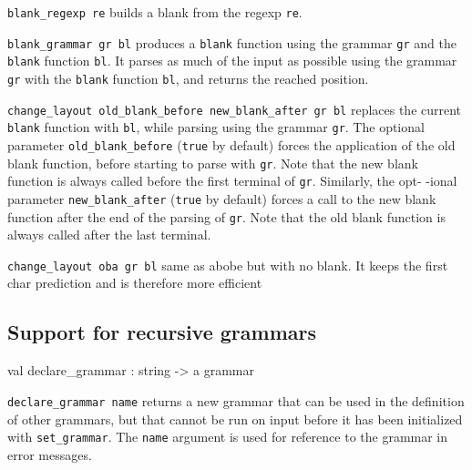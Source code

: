 \documentclass[11pt]{article}
\begin{document}
{\tt{blank\_regexp re}} builds a blank from the regexp {\tt{re}}.



{\tt{blank\_grammar gr bl}} produces a {\tt{blank}} function using the  grammar
    {\tt{gr}} and the {\tt{blank}} function {\tt{bl}}. It parses as much of  the  input
    as possible using the grammar {\tt{gr}} with the {\tt{blank}}  function  {\tt{bl}},
    and returns the reached position.



{\tt{change\_layout {}old\_blank\_before  {}new\_blank\_after  gr bl}}  replaces
    the current  {\tt{blank}}  function with {\tt{bl}},  while  parsing  using the
    grammar {\tt{gr}}.  The optional  parameter {\tt{old\_blank\_before}} ({\tt{true}} by
    default)  forces the application of the old blank  function,  before
    starting to parse with  {\tt{gr}}.  Note  that the new blank  function is
    always called before the first terminal of {\tt{gr}}. Similarly, the opt-
    -ional parameter {\tt{new\_blank\_after}} ({\tt{true}} by default) forces a call
    to the new blank function after the end of the parsing of {\tt{gr}}. Note
    that the old blank function is always called after the last terminal.



{\tt{change\_layout {}oba gr bl}} same as abobe but with no blank.  It
    keeps the first char prediction and is therefore more efficient



\subsection{Support for recursive grammars}




\label{val:Earley.declare-underscoregrammar}\begin{ocamldoccode}
val declare_grammar : string -> {\textquotesingle}a grammar
\end{ocamldoccode}
\begin{ocamldocdescription}
{\tt{declare\_grammar name}} returns a new grammar that can be used in the
    definition of other grammars, but that cannot be run on input before
    it has been initialized with {\tt{set\_grammar}}. The {\tt{name}}  argument  is
    used for reference to the grammar in error messages.


\end{ocamldocdescription}
\end{document}
